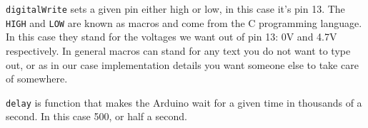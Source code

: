  

 \lstinline|digitalWrite| sets a given pin either high or low,
 in this case it's pin 13.
 The \lstinline|HIGH| and \lstinline|LOW| are known as macros and come from the C programming language.
 In this case they stand for the voltages we want out of pin 13:
 0V and 4.7V respectively.
 In general macros can stand for any text you do not want to type out, or as in our case implementation details you want someone else to take care
 of somewhere.

\lstinline|delay| is function that makes the Arduino wait for a given time in thousands of a second.
In this case 500, or half a second.
